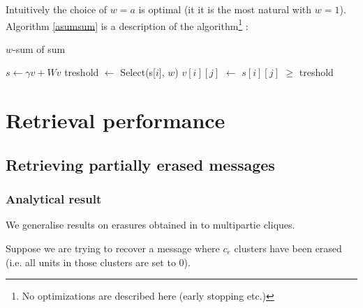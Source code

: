 \documentclass[english,11pt,twocolumn]{IEEEtran}
\renewcommand{\ge}{\geqslant}
\newcommand*\Let[2]{\State #1 $\gets$ #2}
\theoremstyle{definition}
\begin{document}
		Intuitively the choice of $w = a$ is optimal (it it is the most natural with $w = 1$).
		Algorithm \ref{asumsum} is a description of the algorithm\footnote{No optimizations are described here (early stopping etc.)} :
		\begin{algorithm}[!htb]
		\caption{$w$-sum of sum \label{asumsum}}
		\begin{algorithmic}[1]
		\State $s \gets \gamma v + W v$
			\Let{treshold}{Select(s[$i$], $w$)} 
			\Let{$v[i][j]$}{$s[i][j]$ $\ge$ treshold}
			\EndFor
		\EndFor
		\EndFor
		\EndProcedure
		\end{algorithmic}
		\end{algorithm}

	\section{Retrieval performance}	
	

	\subsection{Retrieving partially erased messages}		
		
	\subsubsection{Analytical result}
		
	
	
	
	
	
	
	We generalise results on erasures obtained in \cite{GriBer20117} to multipartie cliques.
	
	Suppose we are trying to recover a message where $c_e$ clusters have been erased (i.e. all units in those clusters are set to $0$).
	
\end{document}
